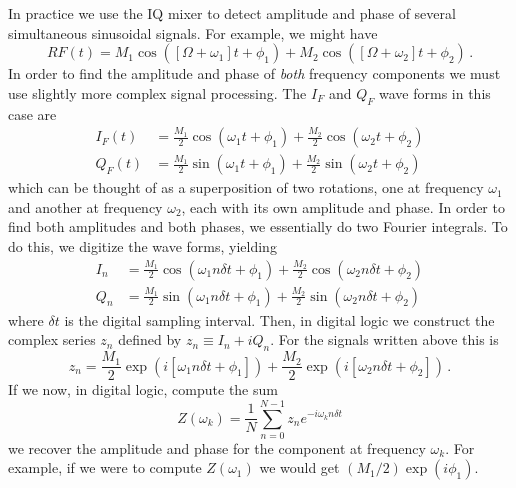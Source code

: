 
In practice we use the IQ mixer to detect amplitude and phase of several simultaneous sinusoidal signals.
For example, we might have
\begin{equation}
RF(t) = M_1 \cos([\Omega + \omega_1] t + \phi_1 ) + M_2 \cos([\Omega + \omega_2] t + \phi_2) \, .
\end{equation}
In order to find the amplitude and phase of \emph{both} frequency components we must use slightly more complex signal processing.
The $I_F$ and $Q_F$ wave forms in this case are
\begin{align}
I_F(t) &= \frac{M_1}{2} \cos(\omega_1 t + \phi_1) + \frac{M_2}{2} \cos(\omega_2 t + \phi_2) \\
Q_F(t) &= \frac{M_1}{2} \sin(\omega_1 t + \phi_1) + \frac{M_2}{2} \sin(\omega_2 t + \phi_2)
\end{align}
which can be thought of as a superposition of two rotations, one at frequency $\omega_1$ and another at frequency $\omega_2$, each with its own amplitude and phase.
In order to find both amplitudes and both phases, we essentially do two Fourier integrals.
To do this, we digitize the wave forms, yielding
\begin{align}
I_n &= \frac{M_1}{2} \cos(\omega_1 n \delta t + \phi_1) + \frac{M_2}{2} \cos(\omega_2 n \delta t + \phi_2) \\
Q_n &= \frac{M_1}{2} \sin(\omega_1 n \delta t + \phi_1) + \frac{M_2}{2} \sin(\omega_2 n \delta t + \phi_2)
\end{align}
where $\delta t$ is the digital sampling interval.
Then, in digital logic we construct the complex series $z_n$ defined by $z_n \equiv I_n + i Q_n$.
For the signals written above this is
\begin{equation}
z_n =
\frac{M_1}{2} \exp \left( i \left[ \omega_1 n \delta t + \phi_1 \right] \right)
+ \frac{M_2}{2} \exp \left( i \left[ \omega_2 n \delta t + \phi_2 \right] \right) \, .
\end{equation}
If we now, in digital logic, compute the sum
\begin{equation}
Z(\omega_k) = \frac{1}{N}\sum_{n=0}^{N-1} z_n e^{-i \omega_k n \delta t}
\end{equation}
we recover the amplitude and phase for the component at frequency $\omega_k$.
For example, if we were to compute $Z(\omega_1)$ we would get $(M_1/2) \exp(i \phi_1)$.
